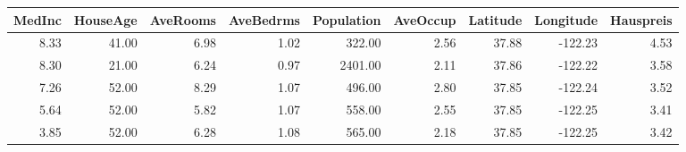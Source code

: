 \begin{tabular}{rrrrrrrrr}
\toprule
MedInc & HouseAge & AveRooms & AveBedrms & Population & AveOccup & Latitude & Longitude & Hauspreis \\
\midrule
8.33 & 41.00 & 6.98 & 1.02 & 322.00 & 2.56 & 37.88 & -122.23 & 4.53 \\
8.30 & 21.00 & 6.24 & 0.97 & 2401.00 & 2.11 & 37.86 & -122.22 & 3.58 \\
7.26 & 52.00 & 8.29 & 1.07 & 496.00 & 2.80 & 37.85 & -122.24 & 3.52 \\
5.64 & 52.00 & 5.82 & 1.07 & 558.00 & 2.55 & 37.85 & -122.25 & 3.41 \\
3.85 & 52.00 & 6.28 & 1.08 & 565.00 & 2.18 & 37.85 & -122.25 & 3.42 \\
\bottomrule
\end{tabular}
